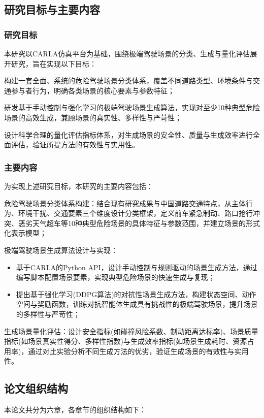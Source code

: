 \subsection{研究目标与主要内容}

\subsubsection{研究目标}
本研究以CARLA仿真平台为基础，围绕极端驾驶场景的分类、生成与量化评估展开研究，旨在实现以下目标：

构建一套全面、系统的危险驾驶场景分类体系，覆盖不同道路类型、环境条件与交通参与者行为，明确各类场景的核心要素与参数特征；

研发基于手动控制与强化学习的极端驾驶场景生成算法，实现对至少10种典型危险场景的高效生成，兼顾场景的真实性、多样性与严苛性；

设计科学合理的量化评估指标体系，对生成场景的安全性、质量与生成效率进行全面评估，验证所提方法的有效性与实用性。

\subsubsection{主要内容}
为实现上述研究目标，本研究的主要内容包括：

危险驾驶场景分类体系构建：结合现有研究成果与中国道路交通特点，从主体行为、环境干扰、交通要素三个维度设计分类框架，定义前车紧急制动、路口抢行冲突、恶劣天气超车等10种典型危险场景的具体特征与参数范围，并建立场景的形式化表示模型；

极端驾驶场景生成算法设计与实现：
\begin{itemize}
    \item 基于CARLA的Python API，设计手动控制与规则驱动的场景生成方法，通过编写脚本配置场景要素，实现典型危险场景的快速生成与复现；
    \item 提出基于强化学习(DDPG算法)的对抗性场景生成方法，构建状态空间、动作空间与奖励函数，训练对抗智能体生成具有挑战性的极端驾驶场景，提升场景的多样性与严苛性；
\end{itemize}

生成场景量化评估：设计安全指标(如碰撞风险系数、制动距离达标率)、场景质量指标(如场景真实性得分、多样性指数)与生成效率指标(如场景生成耗时、资源占用率)，通过对比实验分析不同生成方法的优劣，验证生成场景的有效性与实用性。

\subsection{论文组织结构}
本论文共分为六章，各章节的组织结构如下：

